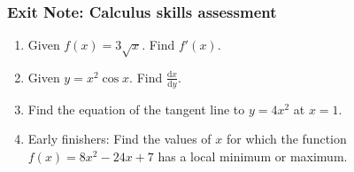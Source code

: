 \documentclass[12pt, twoside]{article}
\begin{document}
\newpage
\setcounter{page}{1}
\subsubsection*{Exit Note: Calculus skills assessment}

\begin{enumerate}
  \item Given $f(x)= 3\sqrt{x}$. Find $f'(x)$. \vspace{4cm}
  \item Given $y= x^2\cos{x}$. Find $\displaystyle \frac{\text{d}x}{\text{d}y}$. \vspace{5cm}
  \item Find the equation of the tangent line to $y=4x^2$ at $x=1$. \vspace{5cm}
  \item Early finishers: Find the values of $x$ for which the function $f(x) = 8x^2-24x+7$ has a local minimum or maximum.


\end{enumerate}
\end{document}
